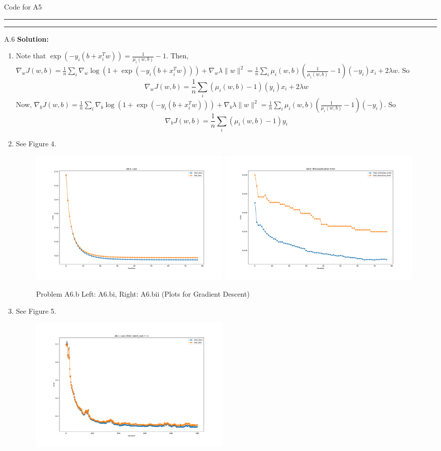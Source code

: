 \documentclass{article}
\newcommand{\1}{\mathbf{1}}
\begin{document}
\inputminted{python}{code/A5.py}
\caption{Code for A5}

\noindent\rule{\textwidth}{1pt}

\noindent\rule{\textwidth}{1pt}
A.6 {\bf Solution:}\\
\begin{enumerate}
    \item Note that $\exp(-y_i(b+x_i^Tw)) = \frac{1}{\mu_i(w,b)} -1$. Then, $\nabla_w J(w,b) = \frac{1}{n}\sum_i \nabla_w \log(1+\exp(-y_i(b+x_i^Tw))) + \nabla_w \lambda \|w\|^2 = \frac{1}{n}\sum_i \mu_i(w, b)(\frac{1}{\mu_i(w,b)} -1)(-y_i)x_i + 2\lambda w$. So
    $$
    \boxed{\nabla_w J(w,b) = \frac{1}{n}\sum_i (\mu_i(w, b) - 1)(y_i)x_i + 2\lambda w}
    $$
    Now, $\nabla_b J(w,b) = \frac{1}{n}\sum_i \nabla_b \log(1+\exp(-y_i(b+x_i^Tw))) + \nabla_b \lambda \|w\|^2 = \frac{1}{n}\sum_i \mu_i(w, b)(\frac{1}{\mu_i(w,b)} -1)(-y_i)$. So
    $$
    \boxed{\nabla_b J(w,b) = \frac{1}{n}\sum_i (\mu_i(w, b) - 1)y_i}
    $$
    \item See Figure 4. 
        \begin{figure}[h!]
            \centering
            \includegraphics[width=0.49\textwidth]{hw2/code/figures/A6b1.pdf}
            \includegraphics[width=0.49\textwidth]{hw2/code/figures/A6b2.pdf}
            \caption{Problem A6.b Left: A6.bi, Right: A6.bii (Plots for Gradient Descent)}
        \end{figure}
    \item See Figure 5.
        \begin{figure}[h!]
            \centering
            \includegraphics[width=0.49\textwidth]{hw2/code/figures/A6c1.pdf}

\end{figure}
\end{enumerate}
\end{document}
